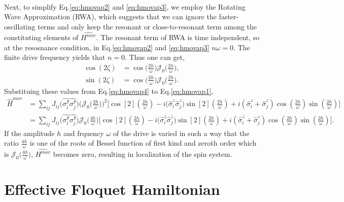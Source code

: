 \documentclass[%
reprint,
superscriptaddress,
amsmath,amssymb,showkeys,
aps,
prb,
]{revtex4-2}
\begin{document}
{\begin{align}
		\label{eq:hmovap3}
	\end{align}
	Next, to simplify Eq.\eqref{eq:hmovap2} and \eqref{eq:hmovap3}, we employ the Rotating Wave Approximation (RWA)\cite{Ashhab2007, Kiely2018, haldar_dynamical_2017, das_exotic_2010,fuji2017,haldar_statistical_2022}, which suggests that we can ignore the faster-oscillating terms and only keep the resonant or close-to-resonant term among the constituting elements of $\hat{H^{mov}}$. 
	The resonant term of RWA  is time independent\cite{Ashhab2007}, so at the resosnance condition, in Eq.\eqref{eq:hmovap2} and \eqref{eq:hmovap3}  $n\omega = 0$. The finite drive frequency yields that $n=0$. Thus one can get,
	\begin{align}
	\cos(2\zeta) &= \cos\Big(\frac{2h}{\omega}\Big)\mathcal{J}_0\Big(\frac{2h}{\omega}\Big),\nonumber\\
	\sin(2\zeta) &= \cos\Big(\frac{2h}{\omega}\Big)\mathcal{J}_0\Big(\frac{2h}{\omega}\Big). 
	\label{eq:hmovap4}
	\end{align}
	Substituing these values from Eq.\eqref{eq:hmovap4} to Eq.\eqref{eq:hmovap1},
	\begin{align}
		\hat{H}^{mov} &= \sum_{ij} J_{ij} \Big(\hat{\sigma^y_i}\hat{\sigma^y_j}\Big)\Bigg(\mathcal{J}_0\Big(\frac{2h}{\omega}\Big)\Bigg) ^2\Bigg[\cos[2](\frac{2h}{\omega}) -i\Big(\hat{\sigma}^z_i\hat{\sigma}^z_j\Big) \sin[2](\frac{2h}{\omega})+ i (\hat{\sigma}^z_i + \hat{\sigma}^z_j)\cos(\frac{2h}{\omega})\sin(\frac{2h}{\omega})\Bigg]\nonumber\\
		&= \sum_{ij} J_{ij} \Big(\hat{\sigma^y_i}\hat{\sigma^y_j}\Big)\mathcal{J}_0\Big(\frac{4h}{\omega}\Big)\Bigg[\cos[2](\frac{2h}{\omega}) -i\Big(\hat{\sigma}^z_i\hat{\sigma}^z_j\Big) \sin[2](\frac{2h}{\omega})+ i (\hat{\sigma}^z_i + \hat{\sigma}^z_j)\cos(\frac{2h}{\omega})\sin(\frac{2h}{\omega})\Bigg].
	\end{align}
	If the amplitude $h$ and frquency $\omega$ of the drive is varied in such a way that the ratio $\frac{4h}{\omega}$ is one of the roots of Bessel function of first kind and zeroth order which is $\mathcal{J}_0\big(\frac{4h}{\omega}\big)$, $\hat{H^{mov}}$ becomes zero, resulting in localization of the spin system.
}


	\section{\label{AppendixB} Effective Floquet Hamiltonian}
	
\end{document}
